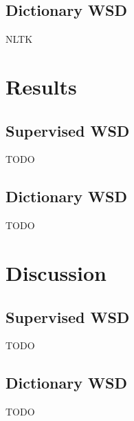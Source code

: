 \documentclass[11pt]{article}
\begin{document}
\subsection{Dictionary WSD}
NLTK


\section{Results}
\subsection{Supervised WSD}
TODO

\subsection{Dictionary WSD}
TODO

\section{Discussion}
\subsection{Supervised WSD}
TODO

\subsection{Dictionary WSD}
TODO
\end{document}
